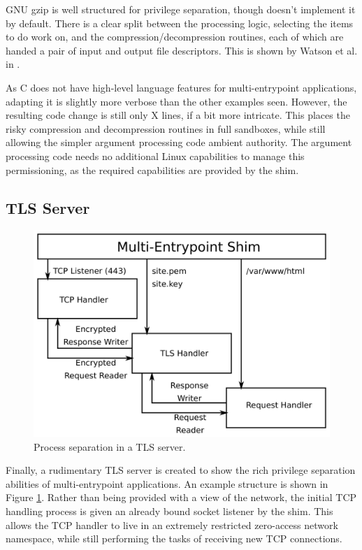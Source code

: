 \documentclass[sigplan]{acmart}
\begin{document}
GNU gzip \citep{gailly_gzip_2020} is well structured for privilege separation, though doesn't implement it by default. There is a clear split between the processing logic, selecting the items to do work on, and the compression/decompression routines, each of which are handed a pair of input and output file descriptors. This is shown by Watson et al. in \cite{watson_capsicum_2010}.

As C does not have high-level language features for multi-entrypoint applications, adapting it is slightly more verbose than the other examples seen. However, the resulting code change is still only X lines, if a bit more intricate. This places the risky compression and decompression routines in full sandboxes, while still allowing the simpler argument processing code ambient authority. The argument processing code needs no additional Linux capabilities to manage this permissioning, as the required capabilities are provided by the shim.

\subsection{TLS Server}

\begin{figure}
    \centering
    \includegraphics[width=\columnwidth]{figures/tls-server-splitting.png}
    \caption{Process separation in a TLS server.}
    \label{fig:tls-server-splitting}
\end{figure}

Finally, a rudimentary TLS server is created to show the rich privilege separation abilities of multi-entrypoint applications. An example structure is shown in Figure \ref{fig:tls-server-splitting}. Rather than being provided with a view of the network, the initial TCP handling process is given an already bound socket listener by the shim. This allows the TCP handler to live in an extremely restricted zero-access network namespace, while still performing the tasks of receiving new TCP connections.
\end{document}
